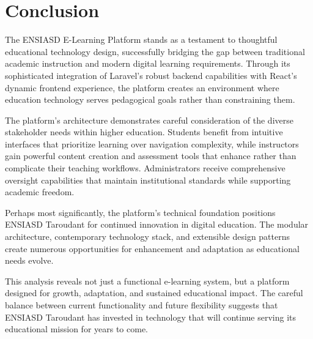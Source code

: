 \documentclass[12pt,a4paper]{article}
\begin{document}
\section{Conclusion}
\label{sec:conclusion}

The ENSIASD E-Learning Platform stands as a testament to thoughtful educational technology design, successfully bridging the gap between traditional academic instruction and modern digital learning requirements. Through its sophisticated integration of Laravel's robust backend capabilities with React's dynamic frontend experience, the platform creates an environment where education technology serves pedagogical goals rather than constraining them.

The platform's architecture demonstrates careful consideration of the diverse stakeholder needs within higher education. Students benefit from intuitive interfaces that prioritize learning over navigation complexity, while instructors gain powerful content creation and assessment tools that enhance rather than complicate their teaching workflows. Administrators receive comprehensive oversight capabilities that maintain institutional standards while supporting academic freedom.

Perhaps most significantly, the platform's technical foundation positions ENSIASD Taroudant for continued innovation in digital education. The modular architecture, contemporary technology stack, and extensible design patterns create numerous opportunities for enhancement and adaptation as educational needs evolve.

This analysis reveals not just a functional e-learning system, but a platform designed for growth, adaptation, and sustained educational impact. The careful balance between current functionality and future flexibility suggests that ENSIASD Taroudant has invested in technology that will continue serving its educational mission for years to come.
\end{document}
